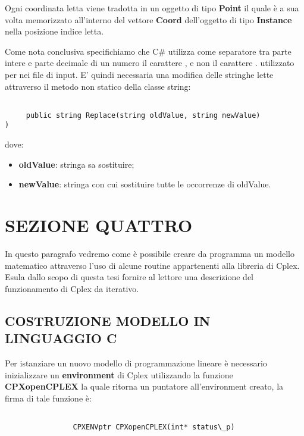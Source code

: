 \documentclass[11pt]{article}
\begin{document}
Ogni coordinata letta viene tradotta in un oggetto di tipo \textbf{Point} il quale è a sua volta memorizzato all'interno del vettore \textbf{Coord} dell'oggetto di tipo \textbf{Instance} nella posizione indice letta.

Come nota conclusiva specifichiamo che C\# utilizza come separatore tra parte intere e parte decimale di un numero il carattere , e non il carattere . utilizzato per nei file di input. E' quindi necessaria una modifica delle stringhe lette attraverso il metodo non statico della classe string:

\begin{lstlisting}

     public string Replace(string oldValue, string newValue)
)

\end{lstlisting}
dove:
\begin{itemize}
    \item \textbf{oldValue}: stringa sa sostituire;
    \item \textbf{newValue}: stringa con cui sostituire tutte le occorrenze di oldValue.
\end{itemize}

\section*{SEZIONE QUATTRO}

In questo paragrafo vedremo come è possibile creare da programma un modello matematico attraverso l'uso di alcune routine appartenenti alla libreria di Cplex. Esula dallo scopo di questa tesi fornire al lettore una descrizione del funzionamento di Cplex da iterativo.


\subsection*{COSTRUZIONE MODELLO IN LINGUAGGIO C}

Per istanziare un nuovo modello di programmazione lineare è necessario inizializzare un \textbf{environment} di Cplex utilizzando la funzione \textbf{CPXopenCPLEX} la quale ritorna un puntatore all'environment creato, la firma di tale funzione è:


\begin{lstlisting}

                CPXENVptr CPXopenCPLEX(int* status\_p)

\end{lstlisting}
\end{document}
